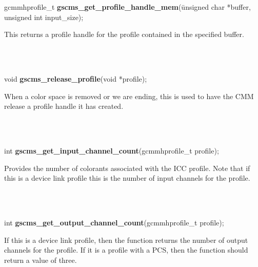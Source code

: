 \documentclass[12pt,notitlepage]{article}
\begin{document}
\begin{tabbing}
\noindent gcmmhprofile\_t {\bf gscms\_get\_profile\_handle\_mem}(\=unsigned char *buffer, \\
\> unsigned int input\_size);\\
\end{tabbing}

\begin{minipage}[h]{6.0in}
	This returns a profile handle for the profile contained in the specified buffer.
\end{minipage}\\
\\

\begin{tabbing}
\noindent void {\bf gscms\_release\_profile}(void *profile);\\
\end{tabbing}

\begin{minipage}[h]{6.0in}
When a color space is removed or we are ending, this is used to have the CMM release a profile handle it has created.
\end{minipage}\\
\\

\begin{tabbing}
\noindent int {\bf gscms\_get\_input\_channel\_count}(gcmmhprofile\_t profile);\\
\end{tabbing}

\begin{minipage}[h]{6.0in}
Provides the number of colorants associated with the ICC profile.  Note that if this is a device link profile this is the number of input channels for the profile.
\end{minipage}\\
\\

\begin{tabbing}
\noindent int {\bf gscms\_get\_output\_channel\_count}(gcmmhprofile\_t profile);\\
\end{tabbing}

\begin{minipage}[h]{6.0in}
If this is a device link profile, then the function returns the number of output channels for the profile.  If it is a profile with a PCS, then the function should return a value of three.
\end{minipage}\\
\\
\end{document}

